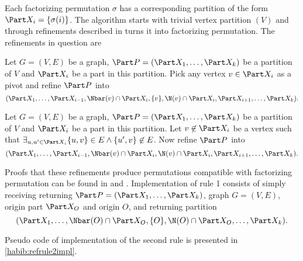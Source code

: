 Each factorizing permutation $\sigma$ has a corresponding partition of the form $\Part X_i = \{\sigma(i)\}$. The algorithm starts with trivial vertex partition $(V)$ and through refinements described in \cite{habib2} turns it into factorizing permutation. The refinements in question are

\begin{defi}\label{habib:refrule1}
    Let $G=(V,E)$ be a graph, $\Part P = (\Part X_1, \ldots, \Part X_k)$ be a partition of $V$ and $\Part X_i$ be a part in this partition. Pick any vertex $v \in \Part X_i$ as a pivot and refine $\Part P$ into
    \[
        (\Part X_1, \ldots, \Part X_{i-1}, \Nbar(v) \cap \Part X_i, \{v\}, \N(v) \cap \Part X_i, \Part X_{i+1}, \ldots, \Part X_k).
    \]
\end{defi}

\begin{defi}\label{habib:refrule2}
    Let $G=(V,E)$ be a graph, $\Part P = (\Part X_1, \ldots, \Part X_k)$ be a partition of $V$ and $\Part X_i$ be a part in this partition. Let $v \not\in \Part X_i$ be a vertex such that $\exists_{u,u' \in \Part X_i} \{u,v\} \in E \land \{u',v\} \not\in E$. Now refine $\Part P$ into
    \[
        (\Part X_1, \ldots, \Part X_{i-1}, \Nbar(v) \cap \Part X_i, \N(v) \cap \Part X_i, \Part X_{i+1}, \ldots, \Part X_k).
    \]
\end{defi}

Proofs that these refinements produce permutations compatible with factorizing permutation can be found in \cite{habib} and \cite{habib2}. Implementation of rule 1 consists of simply receiving returning $\Part P = (\Part X_1, \ldots, \Part X_k)$, graph $G=(V,E)$, origin part $\Part X_O$ and origin $O$, and returning partition
\[
    (\Part X_1, \ldots, \Nbar(O) \cap \Part X_O, \{O\}, \N(O) \cap \Part X_O, \ldots, \Part X_k).
\]
% 

% 
Pseudo code of implementation of the second rule is presented in \ref{habib:refrule2impl}.

